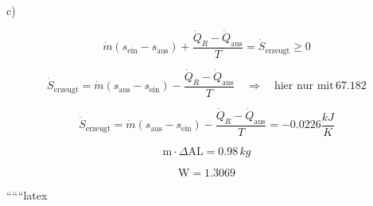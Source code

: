 c) 

\[
\dot{m} (s_{\text{ein}} - s_{\text{aus}}) + \frac{\dot{Q}_R - \dot{Q}_{\text{aus}}}{T} = \dot{S}_{\text{erzeugt}} \geq 0
\]

\[
\dot{S}_{\text{erzeugt}} = \dot{m} (s_{\text{aus}} - s_{\text{ein}}) - \frac{\dot{Q}_R - \dot{Q}_{\text{aus}}}{T} \quad \Rightarrow \quad \text{hier nur mit} \, 67.182
\]

\[
\dot{S}_{\text{erzeugt}} = \dot{m} (s_{\text{aus}} - s_{\text{ein}}) - \frac{\dot{Q}_R - \dot{Q}_{\text{aus}}}{T} = -0.0226 \frac{kJ}{K}
\]

\[
\text{m} \cdot \Delta \text{AL} = 0.98 \, kg
\]

\[
\text{W} = 1.3069
\]

``````latex